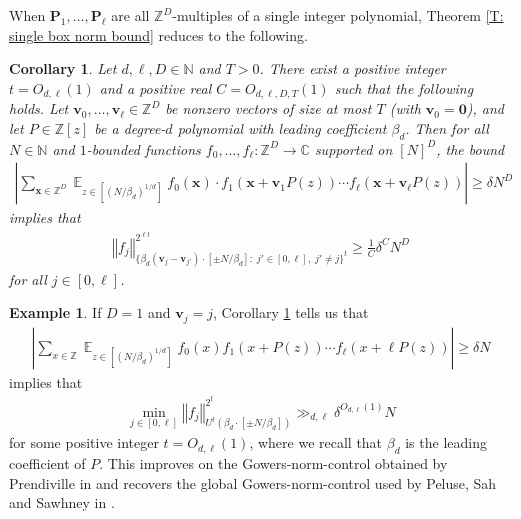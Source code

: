 \documentclass[11pt]{amsart}
\newtheorem{corollary}[lemma]{Corollary}
\theoremstyle{definition}
\newtheorem{example}[lemma]{Example} %
\DeclareMathOperator*{\E}{\mathbb{E}}
\newcommand{\C}{{\mathbb C}}
\newcommand{\N}{{\mathbb N}}
\newcommand{\Z}{{\mathbb Z}}
\newcommand{\p}{{\mathbf{P}}}
\newcommand{\bv}{{\mathbf{v}}}
\newcommand{\bx}{{\mathbf{x}}}
\newcommand{\norm}[1]{\left\Vert #1\right\Vert}
\newcommand{\abs}[1]{\mathopen{}\left| #1\mathclose{}\right|}
\begin{document}
When $\p_1, \ldots, \p_\ell$ are all $\Z^D$-multiples of a single integer polynomial, Theorem \ref{T: single box norm bound} reduces to the following.
\begin{corollary}\label{C: main theorem, same polynomial}
Let $d, \ell,D \in \N$ and $T>0$.  There exist a positive integer $t = O_{d, \ell}(1)$ and a positive real $C=O_{d,\ell,D,T}(1)$ such that the following holds. Let $\bv_0, \ldots, \bv_\ell\in\Z^{{D}}$ be nonzero vectors of size at most $T$ (with $\bv_0 = \mathbf{0}$), and let $P\in\Z[z]$ be a degree-$d$ polynomial with leading coefficient $\beta_d$. 
    Then for all $N\in\N$ and $1$-bounded functions $f_0, \ldots, f_\ell:\Z^D\to\C$ supported on $[N]^D$, the bound
    \begin{align*}
            \abs{\sum_{\bx\in\Z^D}\E_{z\in[(N/\beta_d)^{1/d}]}
            f_0(\bx)\cdot f_1(\bx+\bv_1 P(z))\cdots f_\ell(\bx+\bv_\ell P(z))} \geq \delta N^D
    \end{align*}
    implies that
    \begin{align*}
        \norm{f_j}_{\{\beta_d (\bv_j-\bv_{j'})\cdot[\pm N/\beta_d]:\; j'\in[0,\ell],\; j'\neq j\}^{ t}}^{2^{\ell t}} \geq \frac{1}{C}\delta^{C}N^{D}
    \end{align*}
    for all $j\in[0,\ell]$.
\end{corollary}
\begin{example}
    If $D=1$ and $\bv_j = j$, Corollary \ref{C: main theorem, same polynomial} tells us that
    \begin{align*}
        \abs{\sum_{x\in\Z}\E_{z\in[(N/\beta_d)^{1/d}]} f_0(x)f_1(x+P(z))\cdots f_\ell(x+\ell P(z))}\geq \delta N
    \end{align*}
    implies that
    \begin{align*}
        \min_{j\in[0,\ell]}\norm{f_j}^{2^t}_{U^t(\beta_d\cdot[\pm N/\beta_d])}\gg_{d, \ell}\delta^{O_{d,\ell}(1)}N
    \end{align*}
    for some positive integer $t=O_{d,\ell}(1)$, where we recall that $\beta_d$ is the leading coefficient of $P$. This improves on the Gowers-norm-control obtained by Prendiville in \cite{Pre17} and recovers the global Gowers-norm-control used by Peluse, Sah and Sawhney in \cite{PSS23}.
\end{example}
\end{document}
